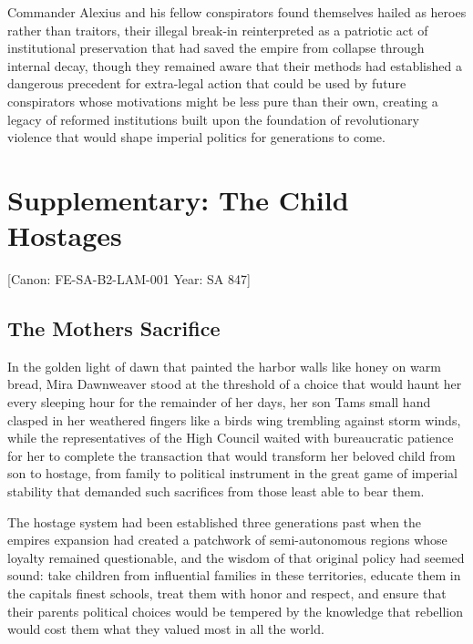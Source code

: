 Commander Alexius and his fellow conspirators found themselves hailed as
heroes rather than traitors, their illegal break-in reinterpreted as a
patriotic act of institutional preservation that had saved the empire
from collapse through internal decay, though they remained aware that
their methods had established a dangerous precedent for extra-legal
action that could be used by future conspirators whose motivations might
be less pure than their own, creating a legacy of reformed institutions
built upon the foundation of revolutionary violence that would shape
imperial politics for generations to come.

\section{Supplementary: The Child
Hostages}\label{supplementary-the-child-hostages}

{[}Canon: FE-SA-B2-LAM-001 \textbar{} Year: SA 847{]}

\subsection{The Mother\textquotesingle s
Sacrifice}\label{the-mothers-sacrifice}

In the golden light of dawn that painted the harbor walls like honey on
warm bread, Mira Dawnweaver stood at the threshold of a choice that
would haunt her every sleeping hour for the remainder of her days, her
son Tam\textquotesingle s small hand clasped in her weathered fingers
like a bird\textquotesingle s wing trembling against storm winds, while
the representatives of the High Council waited with bureaucratic
patience for her to complete the transaction that would transform her
beloved child from son to hostage, from family to political instrument
in the great game of imperial stability that demanded such sacrifices
from those least able to bear them.

The hostage system had been established three generations past when the
empire\textquotesingle s expansion had created a patchwork of
semi-autonomous regions whose loyalty remained questionable, and the
wisdom of that original policy had seemed sound: take children from
influential families in these territories, educate them in the
capital\textquotesingle s finest schools, treat them with honor and
respect, and ensure that their parents\textquotesingle{} political
choices would be tempered by the knowledge that rebellion would cost
them what they valued most in all the world.

